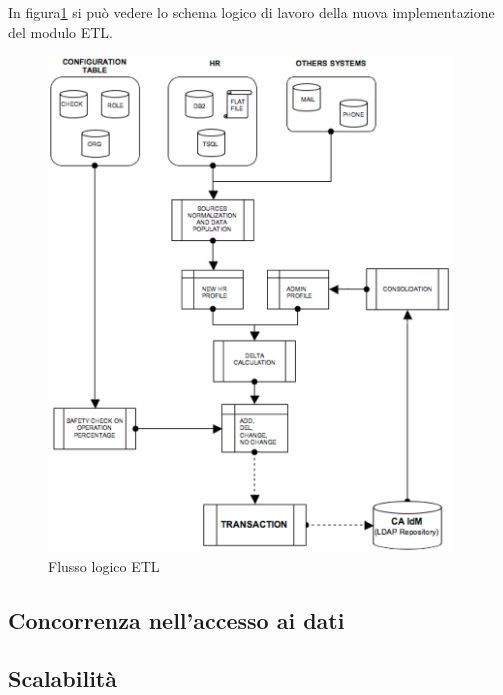 In figura\ref{nuovaimplementazione} si può vedere lo schema logico di lavoro
della nuova implementazione del modulo ETL. 

\begin{figure}[htbp]
\centering
\includegraphics[width=0.95\textwidth]{img/nuovaimplementazione.eps}
\caption{Flusso logico ETL}
\label{nuovaimplementazione}
\end{figure}


\subsection{Concorrenza nell'accesso ai dati}
\subsection{Scalabilità}


